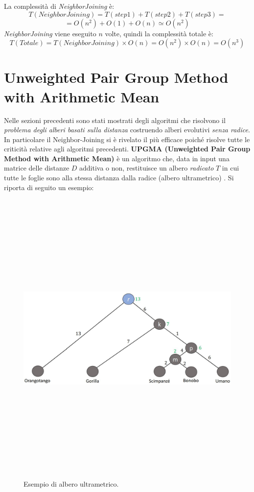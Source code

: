 La complessità di \textit{NeighborJoining} è:
	\[T(NeighborJoining)=T(step1)+T(step2)+T(step3)=\]
	\[=O(n^2)+O(1)+O(n)\simeq O(n^2)\]
\textit{NeighborJoining} viene eseguito $n$ volte, quindi la complessità totale è:
\[T(Totale)=T(NeighborJoining) \times O(n) = O(n^2) \times O(n) = O(n^3) \]

\newpage

\section{Unweighted Pair Group Method with Arithmetic Mean}
Nelle sezioni precedenti sono stati mostrati degli algoritmi che risolvono il \textit{problema degli alberi basati sulla distanza} costruendo alberi evolutivi \textit{senza radice}. In particolare il Neighbor-Joining si è rivelato il più efficace poiché risolve tutte le criticità relative agli algoritmi precedenti.
\newline
\textbf{UPGMA (Unweighted Pair Group Method with Arithmetic Mean)} è un algoritmo che, data in input una matrice delle distanze $D$ additiva o non, restituisce un albero \textit{radicato} $T$ in cui tutte le foglie sono alla stessa distanza dalla radice (albero ultrametrico) \cite{understandingBioinf}.
\newline
Si riporta di seguito un esempio:
\begin{figure}[h!]
\centering
	\includegraphics[height=15cm, width=13cm, keepaspectratio]{rooted_upgma_1.jpg}
 	\caption{Esempio di albero ultrametrico.}
  	\label{fig:rooted_upgma_1}
\end{figure}
